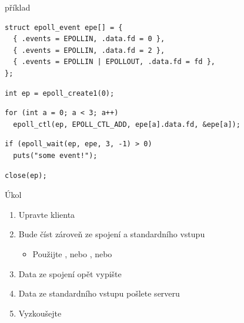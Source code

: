 \begin{frame}[fragile]{ příklad}

  \begin{lstlisting}
struct epoll_event epe[] = {
  { .events = EPOLLIN, .data.fd = 0 },
  { .events = EPOLLIN, .data.fd = 2 },
  { .events = EPOLLIN | EPOLLOUT, .data.fd = fd },
};
  \end{lstlisting}

  \pause

  \begin{lstlisting}
int ep = epoll_create1(0);
  \end{lstlisting}

  \pause

  \begin{lstlisting}
for (int a = 0; a < 3; a++)
  epoll_ctl(ep, EPOLL_CTL_ADD, epe[a].data.fd, &epe[a]);
  \end{lstlisting}

  \pause

  \begin{lstlisting}
if (epoll_wait(ep, epe, 3, -1) > 0)
  puts("some event!");
  \end{lstlisting}

  \pause

  \begin{lstlisting}
close(ep);
  \end{lstlisting}

  \pause

  \begin{center}
  \end{center}

\end{frame}

\fi

\begin{frame}{Úkol}

  \begin{enumerate}
    \item Upravte klienta
    \item Bude číst zároveň ze spojení a standardního vstupu
    \begin{itemize}
      \item Použijte , \ifpcdirlinuxb \else nebo \fi
	\ifpcdirlinuxb, nebo  \fi
    \end{itemize}

    \item Data ze spojení opět vypište
    \item Data ze standardního vstupu pošlete serveru
    \item Vyzkoušejte
  \end{enumerate}

\end{frame}

